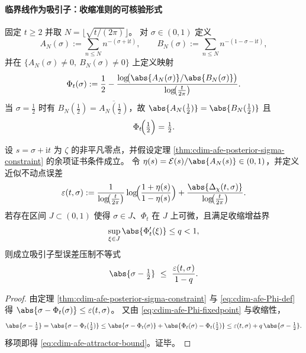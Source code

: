 \paragraph{临界线作为吸引子：收缩准则的可核验形式}
固定 \(t\ge 2\) 并取 \(N=\lfloor\sqrt{t/(2\pi)}\rfloor\)。
对 \(\sigma\in(0,1)\) 定义
\[
A_N(\sigma):=\sum_{n\le N}n^{-(\sigma+\mathrm{i}t)},
\qquad
B_N(\sigma):=\sum_{n\le N}n^{-(1-\sigma-\mathrm{i}t)},
\]
并在 \(\{A_N(\sigma)\neq 0,\ B_N(\sigma)\neq 0\}\) 上定义映射
\begin{equation}\label{eq:cdim-afe-Phi-def}
\Phi_t(\sigma):=\frac12-\frac{\log\!\bigl(\abs{A_N(\sigma)}/\abs{B_N(\sigma)}\bigr)}{\log\!\bigl(\tfrac{t}{2\pi}\bigr)}.
\end{equation}
当 \(\sigma=\tfrac12\) 时有 \(B_N(\tfrac12)=\overline{A_N(\tfrac12)}\)，故 \(\abs{A_N(\tfrac12)}=\abs{B_N(\tfrac12)}\) 且
\begin{equation}\label{eq:cdim-afe-Phi-fixedpoint}
\Phi_t\!\Bigl(\tfrac12\Bigr)=\tfrac12.
\end{equation}

\begin{theorem}[临界线吸引子的可检验收缩准则]\label{thm:cdim-afe-contraction-attractor}
设 \(s=\sigma+\mathrm{i}t\) 为 \(\zeta\) 的非平凡零点，并假设定理 \ref{thm:cdim-afe-posterior-sigma-constraint} 的余项证书条件成立。
令 \(\eta(s)=\mathcal{E}(s)/\abs{A_N(s)}\in(0,1)\)，并定义近似不动点误差
\begin{equation}\label{eq:cdim-afe-epsilon-def}
\varepsilon(t,\sigma):=
\frac{1}{\log\!\bigl(\tfrac{t}{2\pi}\bigr)}
\log\!\Bigl(\frac{1+\eta(s)}{1-\eta(s)}\Bigr)
+
\frac{\abs{\Delta_\chi(t,\sigma)}}{\log\!\bigl(\tfrac{t}{2\pi}\bigr)}.
\end{equation}
若存在区间 \(J\subset(0,1)\) 使得 \(\sigma\in J\)、\(\Phi_t\) 在 \(J\) 上可微，且满足收缩增益界
\[
\sup_{\xi\in J}\abs{\Phi_t'(\xi)}\le q<1,
\]
则成立吸引子型误差压制不等式
\begin{equation}\label{eq:cdim-afe-attractor-bound}
\abs{\sigma-\tfrac12}\ \le\ \frac{\varepsilon(t,\sigma)}{1-q}.
\end{equation}
\end{theorem}
\begin{proof}
由定理 \ref{thm:cdim-afe-posterior-sigma-constraint} 与 \eqref{eq:cdim-afe-Phi-def} 得
\(
\abs{\sigma-\Phi_t(\sigma)}\le \varepsilon(t,\sigma)
\)。
又由 \eqref{eq:cdim-afe-Phi-fixedpoint} 与收缩性，
\[
\abs{\sigma-\tfrac12}
=\abs{\sigma-\Phi_t(\tfrac12)}
\le \abs{\sigma-\Phi_t(\sigma)}+\abs{\Phi_t(\sigma)-\Phi_t(\tfrac12)}
\le \varepsilon(t,\sigma)+q\,\abs{\sigma-\tfrac12}.
\]
移项即得 \eqref{eq:cdim-afe-attractor-bound}。证毕。
\end{proof}

